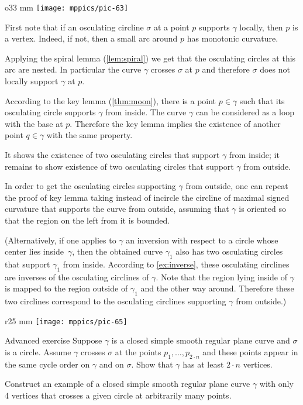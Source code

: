 {

\begin{wrapfigure}{o}{33 mm}
\vskip-0mm
\centering
\texttt{[image: mppics/pic-63]}
\vskip0mm
\end{wrapfigure}

First note that if an osculating circline $\sigma$ at a point $p$ supports $\gamma$ locally, then $p$ is a vertex.
Indeed, if not, then a small arc around $p$ has monotonic curvature.

Applying the spiral lemma (\ref{lem:spiral}) we get that the osculating circles at this arc are nested.
In particular the curve $\gamma$ crosses $\sigma$ at $p$ and therefore $\sigma$ does not locally support $\gamma$ at $p$.
\qeds

}

According to the key lemma (\ref{thm:moon}), there is a point $p\in\gamma$ such that its osculating circle supports $\gamma$ from inside.
The curve $\gamma$ can be considered as a loop with the base at $p$.
Therefore the key lemma implies the existence of another point $q\in\gamma$ with the same property.

It shows the existence of two osculating circles that support $\gamma$ from inside;
it remains to show existence of two osculating circles that support $\gamma$ from outside.

In order to get the osculating circles supporting $\gamma$ from outside, one can repeat the proof of key lemma taking instead of incircle the circline of maximal signed curvature that supports the curve from outside, assuming that $\gamma$ is oriented so that the region on the left from it is bounded.%

(Alternatively, if one applies to $\gamma$ an inversion with respect to a circle whose center lies inside~$\gamma$, then the obtained curve $\gamma_1$ also has  two osculating circles that support $\gamma_1$ from inside.
According to \ref{ex:inverse}, these osculating circlines are inverses of the osculating circlines of $\gamma$.
Note that the region lying inside of $\gamma$ is mapped to the region outside of $\gamma_1$ and the other way around.
Therefore these two circlines correspond to the osculating circlines supporting $\gamma$ from outside.)
\qeds

\begin{wrapfigure}[5]{r}{25 mm}
\vskip-7mm
\centering
\texttt{[image: mppics/pic-65]}
\vskip0mm
\end{wrapfigure}

\begin{thm}{Advanced exercise}\label{ex:curve-crosses-circle}
Suppose $\gamma$ is a closed simple smooth regular plane curve and $\sigma$ is a circle.
Assume $\gamma$ crosses $\sigma$ at the points $p_1,\dots,p_{2{\cdot} n}$ and these points appear in the same cycle order on $\gamma$ and on $\sigma$.
Show that $\gamma$ has at least $2\cdot n$ vertices.

Construct an example of a closed simple smooth regular plane curve $\gamma$ with only 4 vertices that crosses a given circle at arbitrarily many points. 
\end{thm}
